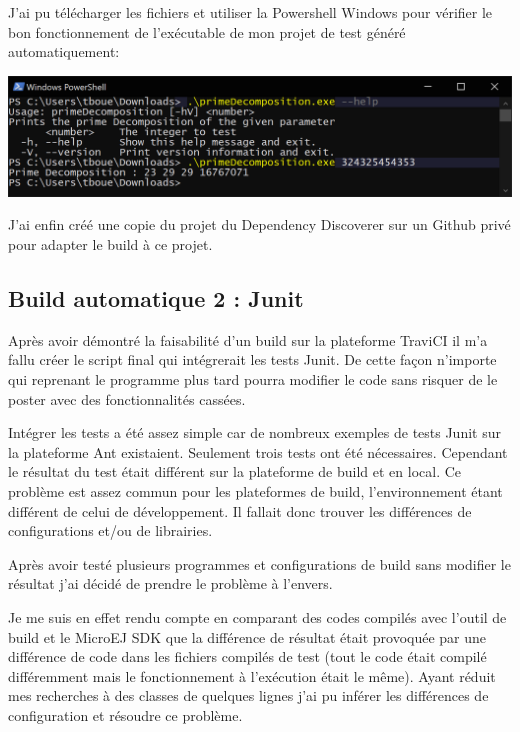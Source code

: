 \documentclass[french,a4paper,12pt]{report}
\begin{document}
J'ai pu télécharger les fichiers et utiliser la Powershell Windows pour vérifier le bon fonctionnement de l’exécutable de mon projet de test généré automatiquement:

\begin{center}
  \includegraphics[width=\textwidth]{ressources/images/exePrime.png}
\end{center}

J'ai enfin créé une copie du projet du Dependency Discoverer sur un Github privé pour adapter le build à ce projet.

\subsection{Build automatique 2 : Junit}

Après avoir démontré la faisabilité d’un build sur la plateforme TraviCI il m’a fallu créer le script final qui intégrerait les tests Junit. De cette façon n’importe qui reprenant le programme plus tard pourra modifier le code sans risquer de le poster avec des fonctionnalités cassées.

Intégrer les tests a été assez simple car de nombreux exemples de tests Junit sur la plateforme Ant existaient. Seulement trois tests ont été nécessaires. Cependant le résultat du test était différent sur la plateforme de build et en local. Ce problème est assez commun pour les plateformes de build, l’environnement étant différent de celui de développement. Il fallait donc trouver les différences de configurations et/ou de librairies.

Après avoir testé plusieurs programmes et configurations de build sans modifier le résultat j’ai décidé de prendre le problème à l’envers.

Je me suis en effet rendu compte en comparant des codes compilés avec l’outil de build et le MicroEJ SDK que la différence de résultat était provoquée par une différence de code dans les fichiers compilés de test (tout le code était compilé différemment mais le fonctionnement à l’exécution était le même). Ayant réduit mes recherches à des classes de quelques lignes j’ai pu inférer les différences de configuration et résoudre ce problème.
\end{document}
